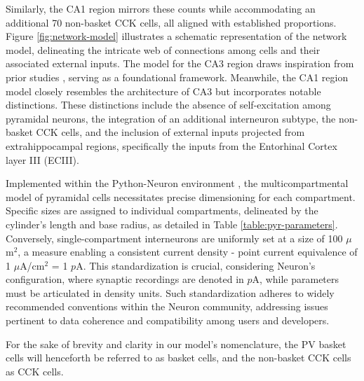 \documentclass[../main.tex]{subfiles}
\begin{document}
Similarly, the CA1 region mirrors these counts while accommodating an additional 70 non-basket CCK cells, all aligned with established proportions.
Figure \ref{fig:network-model} illustrates a schematic representation of the network model, delineating the intricate web of connections among cells and their associated external inputs.
The model for the CA3 region draws inspiration from prior studies \citep{neymotin_ketamine_2011,neymotin_ih_2013}, serving as a foundational framework.
Meanwhile, the CA1 region model closely resembles the architecture of CA3 but incorporates notable distinctions.
These distinctions include the absence of self-excitation among pyramidal neurons, the integration of an additional interneuron subtype, the non-basket CCK cells, and the inclusion of external inputs projected from extrahippocampal regions, specifically the inputs from the Entorhinal Cortex layer III (ECIII).

Implemented within the Python-Neuron environment \citep{hines_neuron_2009}, the multicompartmental model of pyramidal cells necessitates precise dimensioning for each compartment.
Specific sizes are assigned to individual compartments, delineated by the cylinder's length and base radius, as detailed in Table \ref{table:pyr-parameters}.
Conversely, single-compartment interneurons are uniformly set at a size of 100 $\mu$m$^2$, a measure enabling a consistent current density - point current equivalence of 1 $\mu$A/cm$^2$ = 1 $p$A. 
This standardization is crucial, considering Neuron's configuration, where synaptic recordings are denoted in $p$A, while parameters must be articulated in density units.
Such standardization adheres to widely recommended conventions within the Neuron community, addressing issues pertinent to data coherence and compatibility among users and developers.

For the sake of brevity and clarity in our model's nomenclature, the PV basket cells will henceforth be referred to as basket cells, and the non-basket CCK cells as CCK cells.
\end{document}
